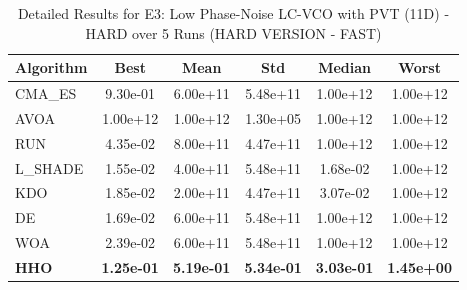 \begin{table}[htbp]
\centering
\caption{Detailed Results for E3: Low Phase-Noise LC-VCO with PVT (11D) - HARD over 5 Runs (HARD VERSION - FAST)}
\label{tab:P3_detailed}
\small
\begin{tabular}{lccccc}
\toprule
\textbf{Algorithm} & \textbf{Best} & \textbf{Mean} & \textbf{Std} & \textbf{Median} & \textbf{Worst} \\
\midrule
CMA_ES & 9.30e-01 & 6.00e+11 & 5.48e+11 & 1.00e+12 & 1.00e+12 \\
AVOA & 1.00e+12 & 1.00e+12 & 1.30e+05 & 1.00e+12 & 1.00e+12 \\
RUN & 4.35e-02 & 8.00e+11 & 4.47e+11 & 1.00e+12 & 1.00e+12 \\
L_SHADE & 1.55e-02 & 4.00e+11 & 5.48e+11 & 1.68e-02 & 1.00e+12 \\
KDO & 1.85e-02 & 2.00e+11 & 4.47e+11 & 3.07e-02 & 1.00e+12 \\
DE & 1.69e-02 & 6.00e+11 & 5.48e+11 & 1.00e+12 & 1.00e+12 \\
WOA & 2.39e-02 & 6.00e+11 & 5.48e+11 & 1.00e+12 & 1.00e+12 \\
\textbf{HHO} & \textbf{1.25e-01} & \textbf{5.19e-01} & \textbf{5.34e-01} & \textbf{3.03e-01} & \textbf{1.45e+00} \\
\bottomrule
\end{tabular}
\end{table}
